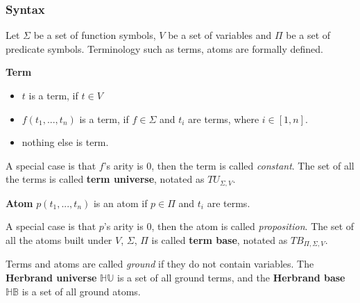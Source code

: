 \subsubsection{Syntax}
\label{sec:FLSyntax}
Let $\Sigma$ be a set of function symbols, $V$ be a set of variables and $\Pi$ be a set of predicate symbols. Terminology such as terms, atoms are formally defined.

\begin{defin} \textbf{Term}
\label{def:Term}
\begin{itemize}

\item $t$ is a term, if $t \in V$

\item $f(t_1,...,t_n)$ is a term, if $f \in \Sigma$ and $t_i$ are terms, where $i \in [1,n]$.

\item nothing else is term.

\end{itemize}
\end{defin}
A special case is that $f$'s arity is 0, then the term is called \textit{constant}. The set of all the terms is called \textbf{term universe}, notated as $TU_{\Sigma,V}$.

\begin{defin} \textbf{Atom}
\label{def:Atom}
$p(t_1,...,t_n)$ is an atom if $p \in \Pi$ and $t_i$ are terms.
\end{defin}
A special case is that $p$'s arity is 0, then the atom is called \textit{proposition}. The set of all the atoms built under $V$, $\Sigma$, $\Pi$ is called \textbf{term base}, notated as $TB_{\Pi,\Sigma,V}$.

Terms and atoms are called \textit{ground} if they do not contain variables. The \textbf{Herbrand universe} $\mathbb{HU}$ is a set of all ground terms, and the \textbf{Herbrand base} $\mathbb{HB}$ is a set of all ground atoms.
